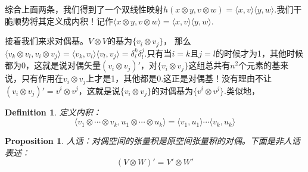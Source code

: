 \documentclass[11pt,a4paper,openany]{book}%
\theoremstyle{plain}%
\newtheorem{pro}{Proposition}[chapter]%
\newtheorem{defi}{Definition}[chapter]%
\begin{document}
综合上面两条，我们得到了一个双线性映射$h(x\otimes y,v \otimes w)=\langle x,v \rangle \langle y,w \rangle$.我们干脆顺势将其定义成内积！记作$\langle x\otimes y,v \otimes w \rangle=\langle x,v \rangle \langle y,w \rangle$.

接着我们来求对偶基。$V\otimes V$的基为$\{v_i \otimes v_j\}$，
那么$\langle v_k\otimes v_l,v_i \otimes v_j\rangle=\langle v_k,v_i \rangle \langle v_l,v_j \rangle=\delta_i^k\delta_l^j$.只有当$i=k$且$j=l$的时候才为1，其他时候都为0，这就是说对偶矢量$(v_i\otimes v_j)'$，对$\{v_i \otimes v_j\}$这组总共有$n^2$个元素的基来说，只有作用在$v_i\otimes v_j$上才是1，其他都是0.这正是对偶基！没有理由不让$(v_i\otimes v_j)'=v^i\otimes v^j$，这就是说$\{v_i \otimes v_j\}$的对偶基为$\{v^i \otimes v^j\}$.类似地，
\begin{defi}
定义内积：
\[
\langle v_1\otimes \cdots \otimes v_k,u_1\otimes \cdots \otimes u_k \rangle=\langle v_1,u_1\rangle \cdots \langle v_k,u_k\rangle
\]
\end{defi}
\begin{pro}
人话：对偶空间的张量积是原空间张量积的对偶。下面是非人话表述：
\[
(V\otimes W)'=V' \otimes W'
\]
\end{pro}
\end{document}

